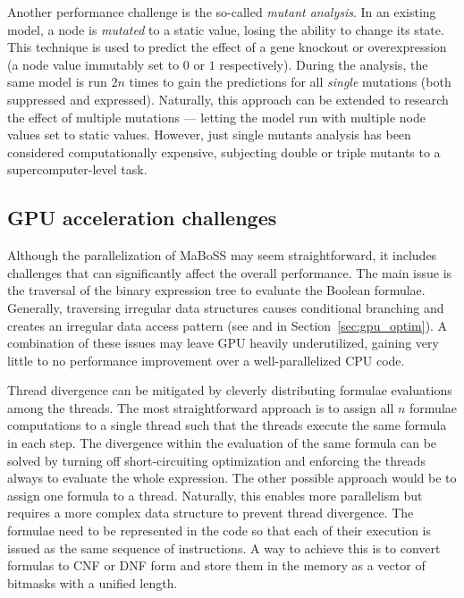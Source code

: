Another performance challenge is the so-called \emph{mutant analysis}. In an existing model, a node is \emph{mutated} to a static value, losing the ability to change its state. This technique is used to predict the effect of a gene knockout or overexpression (a node value immutably set to $0$ or $1$ respectively). During the analysis, the same model is run $2n$ times to gain the predictions for all \emph{single} mutations (both suppressed and expressed). Naturally, this approach can be extended to research the effect of multiple mutations --- letting the model run with multiple node values set to static values. However, just single mutants analysis has been considered computationally expensive, subjecting double or triple mutants to a supercomputer-level task.

\subsection{GPU acceleration challenges}

Although the parallelization of MaBoSS may seem straightforward, it includes challenges that can significantly affect the overall performance. The main issue is the traversal of the binary expression tree to evaluate the Boolean formulae. Generally, traversing irregular data structures causes conditional branching and creates an irregular data access pattern (see  and  in Section~\ref{sec:gpu_optim}). A combination of these issues may leave GPU heavily underutilized, gaining very little to no performance improvement over a well-parallelized CPU code.

Thread divergence can be mitigated by cleverly distributing formulae evaluations among the threads. The most straightforward approach is to assign all $n$ formulae computations to a single thread such that the threads execute the same formula in each step. The divergence within the evaluation of the same formula can be solved by turning off short-circuiting optimization and enforcing the threads always to evaluate the whole expression. 
The other possible approach would be to assign one formula to a thread. Naturally, this enables more parallelism but requires a more complex data structure to prevent thread divergence. The formulae need to be represented in the code so that each of their execution is issued as the same sequence of instructions. A way to achieve this is to convert formulas to CNF or DNF form and store them in the memory as a vector of bitmasks with a unified length.

